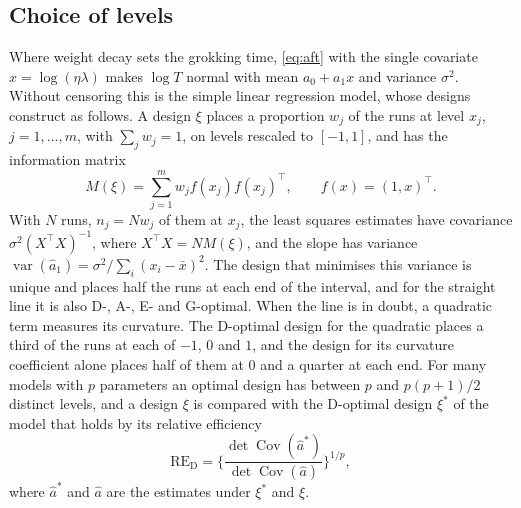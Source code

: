 \documentclass[a4paper,11pt]{article} %
\begin{document}
\subsection{Choice of levels}

Where weight decay sets the grokking time, \eqref{eq:aft} with the single
covariate $x=\log(\eta\lambda)$ makes $\log T$ normal with mean $a_0+a_1x$ and
variance $\sigma^2$. Without censoring this is the simple linear regression
model, whose designs \citet{bergerIntroductionOptimalDesigns2009} construct as
follows. A design $\xi$ places a proportion $w_j$ of the runs at level $x_j$,
$j=1,\dots,m$, with $\sum_j w_j=1$, on levels rescaled to $[-1,1]$, and has the
information matrix
\begin{equation}
  M(\xi) = \sum_{j=1}^{m} w_j f(x_j)f(x_j)^\top ,\qquad f(x) = (1,x)^\top .
\end{equation}
With $N$ runs, $n_j=Nw_j$ of them at $x_j$, the least squares estimates have
covariance $\sigma^2(X^\top X)^{-1}$, where $X^\top X=N M(\xi)$, and the slope
has variance $\operatorname{var}(\hat a_1)=\sigma^2/\sum_i(x_i-\bar x)^2$. The
design that minimises this variance is unique and places half the runs at each
end of the interval, and for the straight line it is also D-, A-, E- and
G-optimal. When the line is in doubt, a quadratic term measures its curvature.
The D-optimal design for the quadratic places a third of the runs at each of
$-1$, $0$ and $1$, and the design for its curvature coefficient alone places
half of them at $0$ and a quarter at each end. For many models with $p$
parameters an optimal design has between $p$ and $p(p+1)/2$ distinct levels,
and a design $\xi$ is compared with the D-optimal design $\xi^*$ of the model
that holds by its relative efficiency
\begin{equation}
  \mathrm{RE}_{\mathrm{D}} = \biggl\{
    \frac{\det\operatorname{Cov}(\hat a^*)}{\det\operatorname{Cov}(\hat a)}
  \biggr\}^{1/p} ,
\end{equation}
where $\hat a^*$ and $\hat a$ are the estimates under $\xi^*$ and $\xi$.
\end{document}
